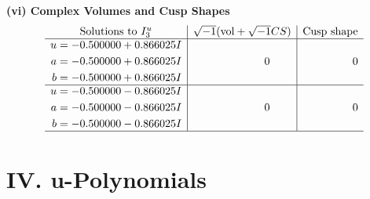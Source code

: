 \documentclass[1p]{elsarticle_modified}
\theoremstyle{definition}
\newcommand{\I}{\sqrt{-1}}
\begin{document}
\newpage\flushleft \textbf{(vi) Complex Volumes and Cusp Shapes}
$$\begin{array}{c|c|c}  
\text{Solutions to }I^u_{3}& \I (\text{vol} + \sqrt{-1}CS) & \text{Cusp shape}\\
 \hline 
\begin{aligned}
u &= -0.500000 + 0.866025 I \\
a &= -0.500000 + 0.866025 I \\
b &= -0.500000 + 0.866025 I\end{aligned}
 & \phantom{-0.000000 } 0 & \phantom{-0.000000 } 0 \\ \hline\begin{aligned}
u &= -0.500000 - 0.866025 I \\
a &= -0.500000 - 0.866025 I \\
b &= -0.500000 - 0.866025 I\end{aligned}
 & \phantom{-0.000000 } 0 & \phantom{-0.000000 } 0\\
 \hline 
 \end{array}$$\newpage
\newpage\renewcommand{\arraystretch}{1}
\centering \section*{ IV. u-Polynomials}
\end{document}
